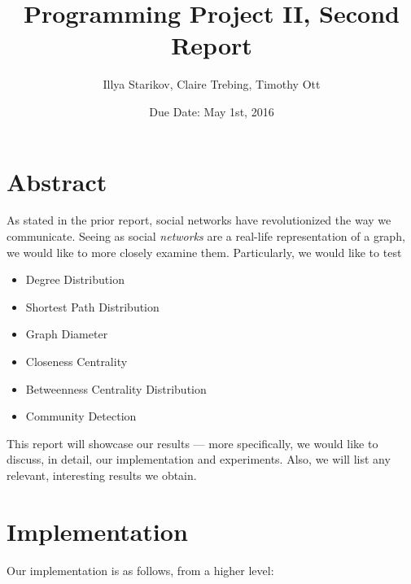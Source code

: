 \documentclass{article}
\title{Programming Project II, Second Report}
\author{Illya Starikov, Claire Trebing, Timothy Ott}
\date{Due Date: May 1st, 2016}
\begin{document}
\maketitle


\section{Abstract}
As stated in the prior report, social networks have revolutionized the way we communicate. Seeing as social \textit{networks} are a real-life representation of a graph, we would like to more closely examine them. Particularly, we would like to test

\begin{itemize}
    \item Degree Distribution
    \item Shortest Path Distribution
    \item Graph Diameter
    \item Closeness Centrality
    \item Betweenness Centrality Distribution
    \item Community Detection
\end{itemize}

This report will showcase our results --- more specifically, we would like to discuss, in detail, our implementation and experiments. Also, we will list any relevant, interesting results we obtain.

\section{Implementation}
Our implementation is as follows, from a higher level:
\end{document}
